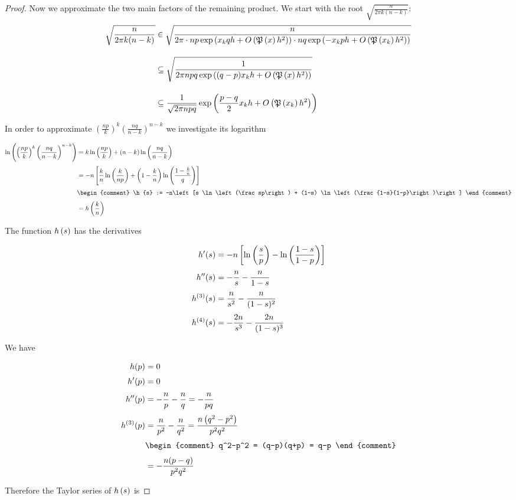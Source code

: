 \begin{proof}
  Now we approximate the two main factors of the remaining product. We start with the root $\sqrt{\frac{n}{2\pi k(n-k)}}$:
  \begin{align}
    \sqrt{\frac{n}{2\pi k(n-k)}} & \in \sqrt{\frac{n}{2\pi \cdot np \fexp{\x qh +\bigo{\pol{x}h^2}} \cdot nq \fexp{-\x ph + \bigo{\pol{\x}h^2}}}} \bnl
    & \subseteq \sqrt{\frac{1}{2\pi npq \fexp{(q-p)\x h +\bigo{\pol{x}h^2}}}} \bnl
    & \subseteq \frac{1}{\sqrt{2\pi npq}} \fexp{\frac{p-q}2 \x h + \bigo{\pol{\x}h^2}}
  \end{align}

  \noindent In order to approximate $\left(\frac{np}{k}\right)^k \left(\frac{nq}{n-k}\right)^{n-k}$ we investigate its logarithm

  \begin{align}
    \ln\left(\left(\frac{np}{k}\right)^k \left(\frac{nq}{n-k}\right)^{n-k}\right) & = k \ln\left(\frac{np}{k}\right) + (n-k) \ln\left(\frac{nq}{n-k}\right) \nl
    &=-n \left[ \frac kn \ln\left(\frac{k}{np}\right) + \left(1-\frac kn\right) \ln\left(\frac{1-\frac kn}{q}\right)\right] \nl
    &
    \begin{comment}
      \h{s} := -n\left[s \ln\left(\frac sp\right) + (1-s) \ln\left(\frac{1-s}{1-p}\right)\right]
    \end{comment} \nl
    &= \h{\frac kn}
  \end{align}

  \noindent The function $h\left({s}\right)$ has the derivatives

  \begin{align}
    h'(s) &= -n\left[\ln\left(\frac sp\right) - \ln\left(\frac{1-s}{1-p}\right)\right] \nl
    h''(s) &= -\frac ns - \frac n{1-s} \nl
    h^{(3)}(s) &= \frac n{s^2} - \frac n{(1-s)^2} \nl
    h^{(4)}(s) &= -\frac {2n}{s^3} - \frac {2n}{(1-s)^3}
  \end{align}

  \noindent We have

  \begin{align}
    h(p)& = 0 \nl
    h'(p)& =0 \nl
    h''(p) & = -\frac np - \frac nq = -\frac n{pq} \nl
    h^{(3)}(p) &= \frac n{p^2}-\frac{n}{q^2} = \frac{n\left(q^2-p^2\right)}{p^2q^2} \nl
    &
    \begin{comment}
      q^2-p^2 = (q-p)(q+p) = q-p
    \end{comment} \nl
    &= -\frac{n(p-q)}{p^2q^2}
  \end{align}

  \noindent Therefore the Taylor series of $h\left({s}\right)$ is


\end{proof}
